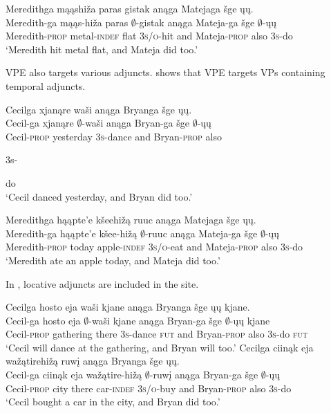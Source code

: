 \documentclass[output=paper]{LSP/langsci}
\begin{document}
\ex\label{ex:johnson:6b} 
\glll Meredithga  {\ob}{\sVP} mąąshiža paras gistak{\cb} anąga Matejaga šge {\ob}ųų{\cb}.\\
Meredith-ga {} mąąs-hiža paras $\emptyset$-gistak anąga Mateja-ga šge {\db}$\emptyset$-ųų\\
Meredith-\textsc{prop} {} metal-\textsc{indef} flat \textsc{3s/o}-hit and Mateja-\textsc{prop} also {\db}\textsc{3s}-do\\
\trans `Meredith hit metal flat, and Mateja did too.'
\z
\z

VPE also targets various adjuncts.  shows that VPE targets VPs containing temporal adjuncts. 
 
\ea\label{ex:johnson:7}
\ea 
\glll Cecilga {\ob}{\sVP} xjanąre waši{\cb} anąga Bryanga šge {\ob}ųų{\cb}.\\
Cecil-ga {} xjanąre $\emptyset$-waši anąga Bryan-ga šge {\db}$\emptyset$-ųų\\
Cecil-\textsc{prop} {} yesterday \textsc{3s}-dance and Bryan-\textsc{prop} also \begin{sc}3s-\end{sc}do\\
\trans `Cecil danced yesterday, and Bryan did too.'

\ex 
\glll Meredithga  {\ob}{\sVP} hąąpte'e kšeehižą ruuc{\cb} anąga Matejaga šge {\ob}ųų{\cb}.\\
Meredith-ga {} hąąpte'e kšee-hižą $\emptyset$-ruuc anąga Mateja-ga šge {\db}$\emptyset$-ųų\\
Meredith-\textsc{prop} {} today apple-\textsc{indef  3s/o}-eat and Mateja-\textsc{prop} also {\db}\textsc{3s}-do\\
\trans `Meredith ate an apple today, and Mateja did too.'
\z
\z

In , locative adjuncts are included in the  site. 
 
\ea\label{ex:johnson:8}
\ea 
\glll Cecilga {\ob}{\sVP} hosto eja waši{\cb} kjane anąga Bryanga šge {\ob}ųų{\cb} kjane.\\
Cecil-ga {} hosto eja $\emptyset$-waši kjane anąga Bryan-ga šge {\db}$\emptyset$-ųų kjane\\
Cecil-\textsc{prop} {} gathering there \textsc{3s}-dance \textsc{fut} and Bryan-\textsc{prop} also \textsc{3s}-do \textsc{fut}\\
\trans `Cecil will dance at the gathering, and Bryan will too.'
\ex 
\glll Cecilga {\ob}{\sVP} ciinąk eja wažątirehižą ruwį{\cb} anąga Bryanga šge {\ob}ųų{\cb}.\\
Cecil-ga {} ciinąk eja wažątire-hižą $\emptyset$-ruwį anąga Bryan-ga šge {\db}$\emptyset$-ųų\\
Cecil-\textsc{prop} {} city there car-\textsc{indef} \textsc{3s/o}-buy and Bryan-\textsc{prop} also {\db}\textsc{3s}-do\\
\trans `Cecil bought a car in the city, and Bryan did too.'
\z
\z
\end{document}
